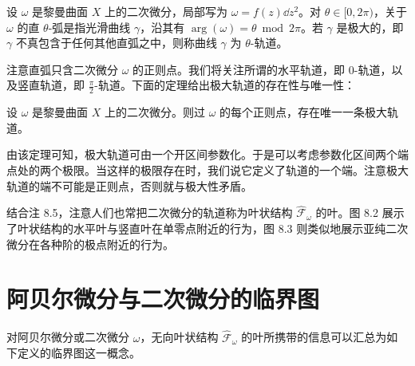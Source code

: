\begin{definition}[8.6] 设 $\omega$ 是黎曼曲面 $X$ 上的二次微分，局部写为 $\omega=f(z)\dd z^2$。对 $\theta\in[0,2\pi)$，关于 $\omega$ 的直 $\theta$-弧是指光滑曲线 $\gamma$，沿其有 $\arg(\omega)=\theta\bmod 2\pi$。若 $\gamma$ 是极大的，即 $\gamma$ 不真包含于任何其他直弧之中，则称曲线 $\gamma$ 为 $\theta$-轨道。\end{definition}

注意直弧只含二次微分 $\omega$ 的正则点。我们将关注所谓的水平轨道，即 0-轨道，以及竖直轨道，即 $\frac{\pi}{2}$-轨道。下面的定理给出极大轨道的存在性与唯一性：


\begin{theorem}[8.7（{{{{{[336, Thm. 5.5]}}}}}）] 设 $\omega$ 是黎曼曲面 $X$ 上的二次微分。则过 $\omega$ 的每个正则点，存在唯一一条极大轨道。\end{theorem}

由该定理可知，极大轨道可由一个开区间参数化。于是可以考虑参数化区间两个端点处的两个极限。当这样的极限存在时，我们说它定义了轨道的一个端。注意极大轨道的端不可能是正则点，否则就与极大性矛盾。

结合注 8.5，注意人们也常把二次微分的轨道称为叶状结构 $\hat{\mathcal{F}}_\omega$ 的叶。图 8.2 展示了叶状结构的水平叶与竖直叶在单零点附近的行为，图 8.3 则类似地展示亚纯二次微分在各种阶的极点附近的行为。

\section{阿贝尔微分与二次微分的临界图}

对阿贝尔微分或二次微分 $\omega$，无向叶状结构 $\hat{\mathcal{F}}_\omega$ 的叶所携带的信息可以汇总为如下定义的临界图这一概念。




